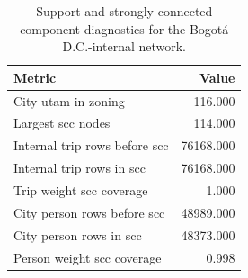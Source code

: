 \begin{table}
\caption{Support and strongly connected component diagnostics for the Bogotá D.C.-internal network.}
\label{tab:s5_support}
\begin{tabular}{lr}
\toprule
Metric & Value \\
\midrule
City utam in zoning & 116.000 \\
Largest scc nodes & 114.000 \\
Internal trip rows before scc & 76168.000 \\
Internal trip rows in scc & 76168.000 \\
Trip weight scc coverage & 1.000 \\
City person rows before scc & 48989.000 \\
City person rows in scc & 48373.000 \\
Person weight scc coverage & 0.998 \\
\bottomrule
\end{tabular}
\end{table}
